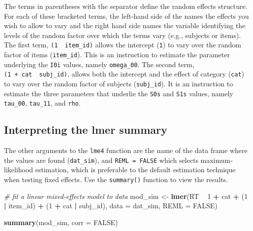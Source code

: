 \documentclass[doc,floatsintext]{apa6}
\newenvironment{Shaded}{\begin{snugshade}}{\end{snugshade}}
\newcommand{\KeywordTok}[1]{\textcolor[rgb]{0.13,0.29,0.53}{\textbf{#1}}}
\newcommand{\DataTypeTok}[1]{\textcolor[rgb]{0.13,0.29,0.53}{#1}}
\newcommand{\DecValTok}[1]{\textcolor[rgb]{0.00,0.00,0.81}{#1}}
\newcommand{\StringTok}[1]{\textcolor[rgb]{0.31,0.60,0.02}{#1}}
\newcommand{\CommentTok}[1]{\textcolor[rgb]{0.56,0.35,0.01}{\textit{#1}}}
\newcommand{\OtherTok}[1]{\textcolor[rgb]{0.56,0.35,0.01}{#1}}
\newcommand{\OperatorTok}[1]{\textcolor[rgb]{0.81,0.36,0.00}{\textbf{#1}}}
\newcommand{\NormalTok}[1]{#1}
\begin{document}
The terms in parentheses with the \texttt{\textbar{}} separator define
the random effects structure. For each of these bracketed terms, the
left-hand side of the \texttt{\textbar{}} names the effects you wish to
allow to vary and the right hand side names the variable identifying the
levels of the random factor over which the terms vary (e.g., subjects or
items). The first term, \texttt{(1\ \textbar{}\ item\_id)} allows the
intercept (\texttt{1}) to vary over the random factor of items
(\texttt{item\_id}). This is an instruction to estimate the parameter
underlying the \texttt{I0i} values, namely \texttt{omega\_00}. The
second term, \texttt{(1\ +\ cat\ \textbar{}\ subj\_id)}, allows both the
intercept and the effect of category (\texttt{cat}) to vary over the
random factor of subjects (\texttt{subj\_id}). It is an instruction to
estimate the three parameters that underlie the \texttt{S0s} and
\texttt{S1s} values, namely \texttt{tau\_00}, \texttt{tau\_11}, and
\texttt{rho}.

\subsection{Interpreting the lmer
summary}\label{interpreting-the-lmer-summary}

The other arguments to the \texttt{lme4} function are the name of the
data frame where the values are found (\texttt{dat\_sim}), and
\texttt{REML\ =\ FALSE} which selects maximum-likelihood estimation,
which is preferable to the default estimation technique when testing
fixed effects. Use the \texttt{summary()} function to view the results.

\begin{Shaded}
\begin{Highlighting}[]
\CommentTok{# fit a linear mixed-effects model to data}
\NormalTok{mod_sim <-}\StringTok{ }\KeywordTok{lmer}\NormalTok{(RT }\OperatorTok{~}\StringTok{ }\DecValTok{1} \OperatorTok{+}\StringTok{ }\NormalTok{cat }\OperatorTok{+}\StringTok{ }\NormalTok{(}\DecValTok{1} \OperatorTok{|}\StringTok{ }\NormalTok{item_id) }\OperatorTok{+}\StringTok{ }\NormalTok{(}\DecValTok{1} \OperatorTok{+}\StringTok{ }\NormalTok{cat }\OperatorTok{|}\StringTok{ }\NormalTok{subj_id),}
                \DataTypeTok{data =}\NormalTok{ dat_sim, }\DataTypeTok{REML =} \OtherTok{FALSE}\NormalTok{)}

\KeywordTok{summary}\NormalTok{(mod_sim, }\DataTypeTok{corr =} \OtherTok{FALSE}\NormalTok{)}
\end{Highlighting}
\end{Shaded}
\end{document}
